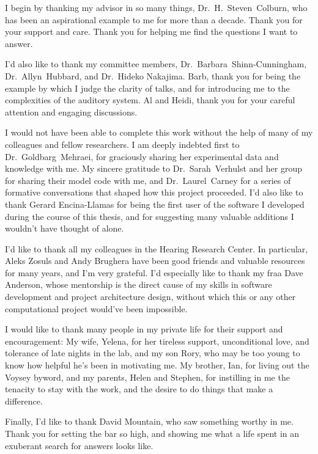 
I begin by thanking my advisor in so many things, Dr.~H.~Steven~Colburn, who has been an aspirational example to me for more than a decade.  Thank you for  your support and care.  Thank you for helping me find the questions I want to answer.   

I'd also like to thank my committee members, Dr.~Barbara~Shinn-Cunningham, Dr.~Allyn~Hubbard, and Dr.~Hideko Nakajima.  Barb, thank you for being the example by which I judge the clarity of talks, and for introducing me to the complexities of the auditory system.  Al and Heidi, thank you for your careful attention and engaging discussions.

I would not have been able to complete this work without the help of many of my colleagues and fellow researchers.  I am deeply indebted first to Dr.~Goldbarg~Mehraei, for graciously sharing her experimental data and knowledge with me.  My sincere gratitude to Dr.~Sarah~Verhulst and her group for sharing their model code with me, and Dr.~Laurel~Carney for a series of formative conversations that shaped how this project proceeded.  I'd also like to thank Gerard Encina-Llamas for being the first user of the software I developed during the course of this thesis, and for suggesting many valuable additions I wouldn't have thought of alone.

I'd like to thank all my colleagues in the Hearing Research Center.  In particular, Aleks Zosuls and Andy Brughera have been good friends and valuable resources for many years, and I'm very grateful.  I'd especially like to thank my fraa Dave Anderson, whose mentorship is the direct cause of my skills in software development and project architecture design, without which this or any other computational project would've been impossible.  

I would like to thank many people in my private life for their support and encouragement:  My wife, Yelena, for her tireless support, unconditional love, and  tolerance of late nights in the lab, and my son Rory, who may be too young to know how helpful he's been in motivating me.  My brother, Ian, for living out the Voysey byword, and my parents, Helen and Stephen, for instilling in me the tenacity to stay with the work, and the desire to do things that make a difference.

Finally, I'd like to thank David Mountain, who saw something worthy in me. Thank you for setting the bar so high, and showing me what a life spent in an exuberant search for answers looks like. 